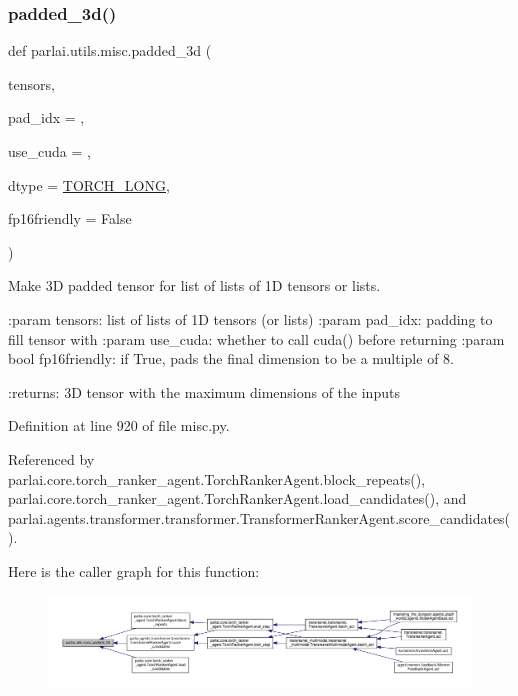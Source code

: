 \subsubsection{\texorpdfstring{padded\+\_\+3d()}{padded\_3d()}}
{\footnotesize\ttfamily def parlai.\+utils.\+misc.\+padded\+\_\+3d (\begin{DoxyParamCaption}\item[{}]{tensors,  }\item[{}]{pad\+\_\+idx = {},  }\item[{}]{use\+\_\+cuda = {},  }\item[{}]{dtype = {\ttfamily \hyperlink{namespaceparlai_1_1utils_1_1misc_ac49ec9bcd5fe586085eb9fab8f40fdb5}{T\+O\+R\+C\+H\+\_\+\+L\+O\+NG}},  }\item[{}]{fp16friendly = {\ttfamily False} }\end{DoxyParamCaption})}

\begin{DoxyVerb}Make 3D padded tensor for list of lists of 1D tensors or lists.

:param tensors:
    list of lists of 1D tensors (or lists)
:param pad_idx:
    padding to fill tensor with
:param use_cuda:
    whether to call cuda() before returning
:param bool fp16friendly:
    if True, pads the final dimension to be a multiple of 8.

:returns:
    3D tensor with the maximum dimensions of the inputs
\end{DoxyVerb}
 

Definition at line 920 of file misc.\+py.



Referenced by parlai.\+core.\+torch\+\_\+ranker\+\_\+agent.\+Torch\+Ranker\+Agent.\+block\+\_\+repeats(), parlai.\+core.\+torch\+\_\+ranker\+\_\+agent.\+Torch\+Ranker\+Agent.\+load\+\_\+candidates(), and parlai.\+agents.\+transformer.\+transformer.\+Transformer\+Ranker\+Agent.\+score\+\_\+candidates().

Here is the caller graph for this function\+:
\nopagebreak
\begin{figure}[H]
\begin{center}
\leavevmode
\includegraphics[width=350pt]{namespaceparlai_1_1utils_1_1misc_ad96b0c9ef6237d9ca051251089faf2c7_icgraph}
\end{center}
\end{figure}
\mbox{\label{namespaceparlai_1_1utils_1_1misc_ad3f3c350e8b394482f73a240e19ec3ac}} 
